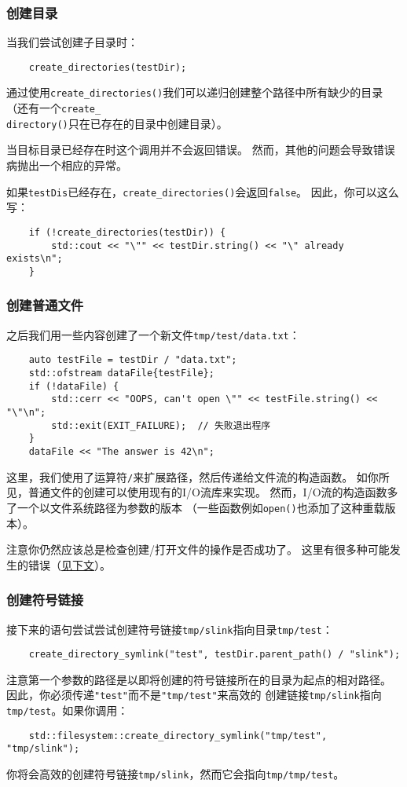 \subsubsection{创建目录}
当我们尝试创建子目录时：
\begin{lstlisting}
    create_directories(testDir);
\end{lstlisting}
通过使用\texttt{create\_directories()}我们可以递归创建整个路径中所有缺少的目录
（还有一个\texttt{create\_\\
directory()}只在已存在的目录中创建目录）。

当目标目录已经存在时这个调用并不会返回错误。
然而，其他的问题会导致错误病抛出一个相应的异常。

如果\texttt{testDis}已经存在，\texttt{create\_directories()}会返回\texttt{false}。
因此，你可以这么写：
\begin{lstlisting}
    if (!create_directories(testDir)) {
        std::cout << "\"" << testDir.string() << "\" already exists\n";
    }
\end{lstlisting}

\subsubsection{创建普通文件}
之后我们用一些内容创建了一个新文件\texttt{tmp/test/data.txt}：
\begin{lstlisting}
    auto testFile = testDir / "data.txt";
    std::ofstream dataFile{testFile};
    if (!dataFile) {
        std::cerr << "OOPS, can't open \"" << testFile.string() << "\"\n";
        std::exit(EXIT_FAILURE);  // 失败退出程序
    }
    dataFile << "The answer is 42\n";
\end{lstlisting}
这里，我们使用了运算符\texttt{/}来扩展路径，然后传递给文件流的构造函数。
如你所见，普通文件的创建可以使用现有的I/O流库来实现。
然而，I/O流的构造函数多了一个以文件系统路径为参数的版本
（一些函数例如\texttt{open()}也添加了这种重载版本）。

注意你仍然应该总是检查创建/打开文件的操作是否成功了。
这里有很多种可能发生的错误（\hyperref[ch20.1.3.6]{见下文}）。

\subsubsection{创建符号链接}
接下来的语句尝试尝试创建符号链接\texttt{tmp/slink}指向目录\texttt{tmp/test}：
\begin{lstlisting}
    create_directory_symlink("test", testDir.parent_path() / "slink");
\end{lstlisting}
注意第一个参数的路径是以即将创建的符号链接所在的目录为起点的相对路径。
因此，你必须传递\texttt{"test"}而不是\texttt{"tmp/test"}来高效的
创建链接\texttt{tmp/slink}指向\texttt{tmp/test}。如果你调用：
\begin{lstlisting}
    std::filesystem::create_directory_symlink("tmp/test", "tmp/slink");
\end{lstlisting}
你将会高效的创建符号链接\texttt{tmp/slink}，然而它会指向\texttt{tmp/tmp/test}。

